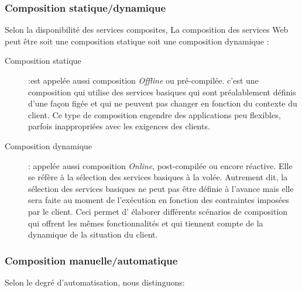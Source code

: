     \subsubsection{Composition statique/dynamique}
    \label{sec:comp-stat}
    Selon la disponibilité des services composites, La composition des
    services Web peut être soit une composition statique soit une
    composition dynamique \cite{driss2011approche}:

    \renewcommand{\descriptionlabel}[1]{\hspace{0.5cm}\textbullet~\textsf{#1}}
    \begin{description}
    \item[Composition statique] :est appelée aussi composition
      \textit{Offline} ou pré-compilée. c'est une composition qui
      utilise des services basiques qui sont préalablement définis
      d'une façon figée et qui ne peuvent pas changer en fonction du
      contexte du client. Ce type de composition engendre des
      applications peu flexibles, parfois inappropriées avec les
      exigences des clients.

    \item[Composition dynamique]: appelée aussi composition
      \textit{Online}, post-compilée ou encore réactive. Elle se
      réfère à la sélection des services basiques à la volée. Autrement
      dit, la sélection des services basiques ne peut pas être définie
      à l'avance mais elle sera faite au moment de l'exécution en
      fonction des contraintes imposées par le client. Ceci permet d'
      élaborer différents scénarios de composition qui offrent les
      mêmes fonctionnalités et qui tiennent compte de la dynamique de
      la situation du client.
    \end{description}
    \enddescription

    \subsubsection{Composition manuelle/automatique}
    \label{sec:comp-manu}
    Selon le degré d'automatisation, nous distinguons:

